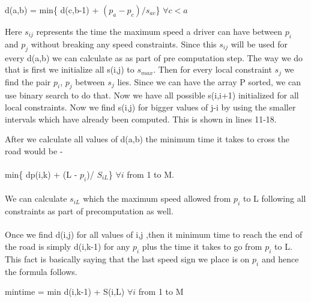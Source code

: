 \documentclass[12pt]{article}
\begin{document}
d(a,b) = min\{ d(c,b-1) + $(p_a - p_c)/s_{ac}$\} $\forall c < a $

Here $s_{ij}$ represents the time the maximum speed a driver can have between $p_i$ and $p_j$ without breaking any speed constraints. Since this $s_{ij}$ will be used for every d(a,b) we can calculate as as part of pre computation step. The way we do that is first we initialize all s(i,j) to $s_{max}$. Then for every local constraint $s_j$ we find the pair $p_i$, $p_j$ between $s_j$ lies. Since we can have the array P sorted, we can use binary search to do that. Now we have all possible s(i,i+1) initialized for all local constraints. Now we find s(i,j) for bigger values of j-i by using the smaller intervals which have already been computed. This is shown in lines 11-18.

After we calculate all values of d(a,b) the minimum time it takes to cross the road would be - \\\\
min\{ dp(i,k) + (L - $p_i$)/ $S_{iL}$\} $\forall i$ from  1 to M. \\\\
We can calculate $s_{iL}$ which the maximum speed allowed from $p_i$ to L following all constraints as part of precomputation as well. \\\\Once we find d(i,j) for all values of i,j ,then it minimum time to reach the end of the road is simply d(i,k-1) for any $p_i$ plus the time it takes to go from $p_i$ to L. This fact is basically saying that the last speed sign we place is on $p_i$ and hence the formula follows.

mintime = min{ d(i,k-1) + S(i,L) }$\forall i$ from 1 to M
\end{document}
